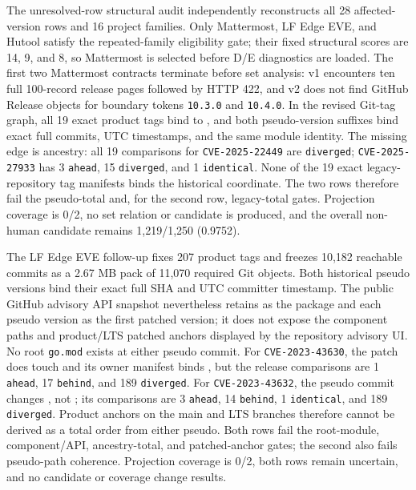 The unresolved-row structural audit independently reconstructs all 28 affected-version rows and 16 project families. Only Mattermost, LF Edge EVE, and Hutool satisfy the repeated-family eligibility gate; their fixed structural scores are 14, 9, and 8, so Mattermost is selected before D/E diagnostics are loaded. The first two Mattermost contracts terminate before set analysis: v1 encounters ten full 100-record release pages followed by HTTP 422, and v2 does not find GitHub Release objects for boundary tokens \texttt{10.3.0} and \texttt{10.4.0}. In the revised Git-tag graph, all 19 exact product tags bind  to , and both pseudo-version suffixes bind exact full commits, UTC timestamps, and the same module identity. The missing edge is ancestry: all 19 comparisons for \texttt{CVE-2025-22449} are \texttt{diverged}; \texttt{CVE-2025-27933} has 3 \texttt{ahead}, 15 \texttt{diverged}, and 1 \texttt{identical}. None of the 19 exact legacy-repository tag manifests binds the historical coordinate. The two rows therefore fail the pseudo-total and, for the second row, legacy-total gates. Projection coverage is 0/2, no set relation or candidate is produced, and the overall non-human candidate remains 1,219/1,250 (0.9752).

The LF Edge EVE follow-up fixes 207 product tags and freezes 10,182 reachable commits as a 2.67 MB pack of 11,070 required Git objects. Both historical pseudo versions bind their exact full SHA and UTC committer timestamp. The public GitHub advisory API snapshot nevertheless retains  as the package and each pseudo version as the first patched version; it does not expose the component paths and product/LTS patched anchors displayed by the repository advisory UI. No root \texttt{go.mod} exists at either pseudo commit. For \texttt{CVE-2023-43630}, the patch does touch  and its owner manifest binds , but the release comparisons are 1 \texttt{ahead}, 17 \texttt{behind}, and 189 \texttt{diverged}. For \texttt{CVE-2023-43632}, the pseudo commit changes , not ; its comparisons are 3 \texttt{ahead}, 14 \texttt{behind}, 1 \texttt{identical}, and 189 \texttt{diverged}. Product anchors on the main and LTS branches therefore cannot be derived as a total order from either pseudo. Both rows fail the root-module, component/API, ancestry-total, and patched-anchor gates; the second also fails pseudo-path coherence. Projection coverage is 0/2, both rows remain uncertain, and no candidate or coverage change results.

